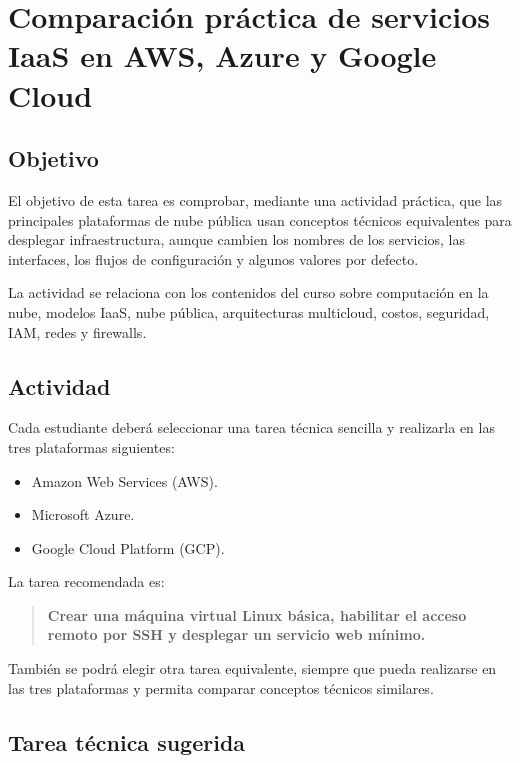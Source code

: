 \documentclass[
  coursetitle={Cómputo Nube y Tecnologías Emergentes},
  coursehours={96},
  coursedate={Verano 2026},
  doctype={Tarea 1},
  otherlangs={english,french},
  authorname={Lázaro},
  authorsurname={Bustio-Martínez},
  authortitle={PhD},
  role={Profesor Investigador},
  email={lbustio@inaoe.mx},
  phone={5559504000},
  ext={7459},
  institution={Instituto Nacional de Astrofísica, Óptica y Electrónica (INAOE)},
  department={Maestría en Ciencias en Tecnologías de Seguridad},
  address={Luis Enrique Erro 1, Sta. Ma. Tonantzintla, San Andrés Cholula, CP 72840, Puebla, México},
  margin={0.5in}
]{lbustio_lecture_notes}
\begin{document}
\IberoCover

\section{Comparación práctica de servicios IaaS en AWS, Azure y Google Cloud}
\label{sec:tarea-iaas-aws-azure-gcp}

\subsection{Objetivo}
\label{sec:tarea1-objetivo}

El objetivo de esta tarea es comprobar, mediante una actividad práctica, que las principales plataformas de nube pública usan conceptos técnicos equivalentes para desplegar infraestructura, aunque cambien los nombres de los servicios, las interfaces, los flujos de configuración y algunos valores por defecto.

La actividad se relaciona con los contenidos del curso sobre computación en la nube, modelos IaaS, nube pública, arquitecturas multicloud, costos, seguridad, IAM, redes y firewalls.

\subsection{Actividad}
\label{sec:tarea1-actividad}

Cada estudiante deberá seleccionar una tarea técnica sencilla y realizarla en las tres plataformas siguientes:

\begin{itemize}
  \item Amazon Web Services (AWS).
  \item Microsoft Azure.
  \item Google Cloud Platform (GCP).
\end{itemize}

La tarea recomendada es:

\begin{quote}
\textbf{Crear una máquina virtual Linux básica, habilitar el acceso remoto por SSH y desplegar un servicio web mínimo.}
\end{quote}

También se podrá elegir otra tarea equivalente, siempre que pueda realizarse en las tres plataformas y permita comparar conceptos técnicos similares.

\subsection{Tarea técnica sugerida}
\label{sec:tarea1-tarea-tecnica}
\end{document}
